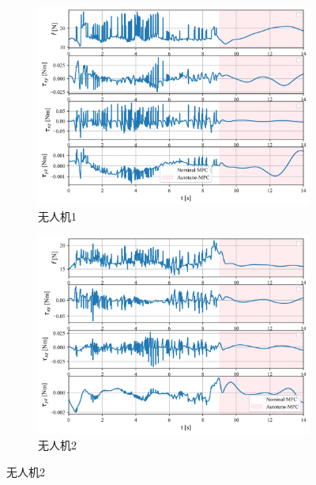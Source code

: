 \documentclass[lang=chs, degree=master, blindreview=false, winfonts=true]{yanputhesis}
\begin{document}
\begin{figure}[H]
	\centering
	\begin{subfigure}[b]{0.48\textwidth}
		\centering
		\includegraphics[width=\textwidth]{picture/kk/1.png}
		\caption{无人机1}
		\label{quadrotoru0}
	\end{subfigure}
	\hfill
	\begin{subfigure}[b]{0.48\textwidth}
		\centering
		\includegraphics[width=\textwidth]{picture/kk/2.png}
		\caption{无人机2}
		\label{quadrotoru1}
	\end{subfigure}
	
	\vspace{0.5cm} %
	

\end{figure}
\end{document}
